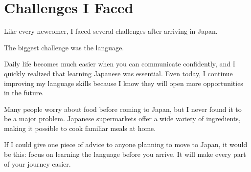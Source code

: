 \section{Challenges I Faced}

Like every newcomer, I faced several challenges after arriving in Japan.

The biggest challenge was the language.

Daily life becomes much easier when you can communicate confidently, and I quickly realized that learning Japanese was essential. Even today, I continue improving my language skills because I know they will open more opportunities in the future.

Many people worry about food before coming to Japan, but I never found it to be a major problem. Japanese supermarkets offer a wide variety of ingredients, making it possible to cook familiar meals at home.

If I could give one piece of advice to anyone planning to move to Japan, it would be this: focus on learning the language before you arrive. It will make every part of your journey easier.